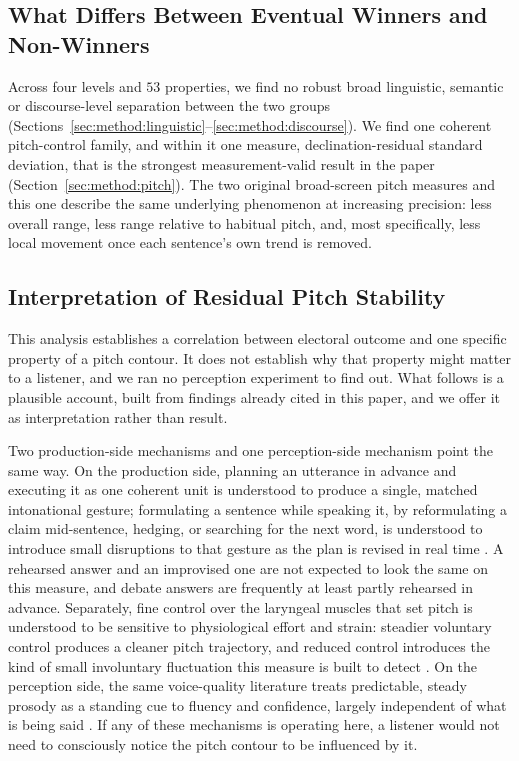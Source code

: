 \documentclass[journal]{IEEEtran}
\begin{document}
\subsection{What Differs Between Eventual Winners and Non-Winners}
\label{sec:disc:whatdiffers}

Across four levels and $53$ properties, we find no robust broad linguistic,
semantic or discourse-level separation between the two groups
(Sections~\ref{sec:method:linguistic}--\ref{sec:method:discourse}). We find
one coherent pitch-control family, and within it one measure,
declination-residual standard deviation, that is the strongest
measurement-valid result in the paper (Section~\ref{sec:method:pitch}). The
two original broad-screen pitch measures and this one describe the same
underlying phenomenon at increasing precision: less overall range, less
range relative to habitual pitch, and, most specifically, less local
movement once each sentence's own trend is removed.

\subsection{Interpretation of Residual Pitch Stability}
\label{sec:disc:mechanism}

This analysis establishes a correlation between electoral outcome and one
specific property of a pitch contour. It does not establish why that
property might matter to a listener, and we ran no perception experiment to
find out. What follows is a plausible account, built from findings already
cited in this paper, and we offer it as interpretation rather than result.

Two production-side mechanisms and one perception-side mechanism point the
same way. On the production side, planning an utterance in advance and
executing it as one coherent unit is understood to produce a single, matched
intonational gesture; formulating a sentence while speaking it, by
reformulating a claim mid-sentence, hedging, or searching for the next word,
is understood to introduce small disruptions to that gesture as the plan is
revised in real time \cite{levelt1989speaking}. A rehearsed answer and an
improvised one are not expected to look the same on this measure, and
debate answers are frequently at least partly rehearsed in advance.
Separately, fine control over the laryngeal muscles that set pitch is
understood to be sensitive to physiological effort and strain: steadier
voluntary control produces a cleaner pitch trajectory, and reduced control
introduces the kind of small involuntary fluctuation this measure is built
to detect \cite{laver1980voice}. On the perception side, the same
voice-quality literature treats predictable, steady prosody as a standing
cue to fluency and confidence, largely independent of what is being said
\cite{laver1980voice}. If any of these mechanisms is operating here, a
listener would not need to consciously notice the pitch contour to be
influenced by it.
\end{document}
